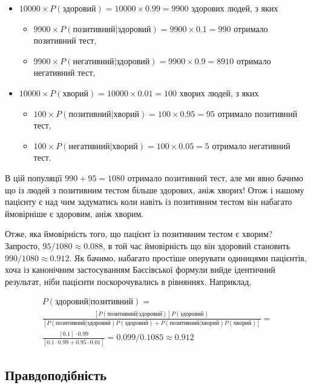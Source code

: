 \documentclass[
  11pt,
]{book}
\begin{document}
\begin{itemize}
\item
  \(10000 \times P(\text{здоровий}) = 10000 \times 0.99 = 9900\) здорових людей, з яких

  \begin{itemize}
  \item
    \(9900 \times P(\text{позитивний|здоровий}) = 9900 \times 0.1 = 990\) отримало позитивний тест,
  \item
    \(9900 \times P(\text{негативний|здоровий}) = 9900 \times 0.9 = 8910\) отримало негативний тест,
  \end{itemize}
\item
  \(10000 \times P(\text{хворий}) = 10000 \times 0.01 = 100\) хворих людей, з яких

  \begin{itemize}
  \item
    \(100 \times P(\text{позитивний|хворий}) = 100 \times 0.95 = 95\) отримало позитивний тест,
  \item
    \(100 \times P(\text{негативний|хворий}) = 100 \times 0.05 = 5\) отримало негативний тест.
  \end{itemize}
\end{itemize}

В цій популяції \(990 + 95 = 1080\) отримало позитивний тест, але ми явно бачимо що із людей з позитивним тестом більше здорових, аніж хворих! Отож і нашому пацієнту є над чим задуматись коли навіть із позитивним тестом він набагато ймовірніше є здоровим, аніж хворим.

Отже, яка ймовірність того, що пацієнт із позитивним тестом є хворим? Запросто, \(95/1080 \approx 0.088\), в той час ймовірність що він здоровий становить \(990/1080 \approx 0.912\). Як бачимо, набагато простіше оперувати одиницями пацієнтів, хоча із канонічним застосуванням Баєсівської формули вийде ідентичний результат, ніби пацієнти поскорочувались в рівняннях. Наприклад,

\[
\begin{aligned}
  P(\text{здоровий|позитивний}) = \\ 
  \frac{[P(позитивний|здоровий)] P(здоровий)}{[P(позитивний|здоровий) P(здоровий) + P(позитивний|хворий) P(хворий)]} = \\
  \frac{[0.1] \cdot 0.99}{[0.1 \cdot 0.99 + 0.95 \cdot 0.01]} = 0.099/0.1085 \approx 0.912
\end{aligned}
\]

\subsection{Правдоподібність}\label{mle}
\end{document}
